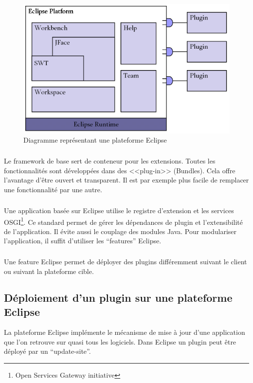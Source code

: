 \begin{figure}[!h]
\begin{center}
  \includegraphics[scale=.55]{images/archi_eclipse_platform.png}
  \caption{Diagramme représentant une plateforme Eclipse}
  \label{PlatformEclipse}
\end{center}
\end{figure}

\subparagraph*{}
Le framework de base sert de conteneur pour les extensions.
Toutes les fonctionnalités sont développées dans des <<plug-in>> (Bundles).
Cela offre l'avantage d'être ouvert et transparent. 
Il est par exemple plus facile de remplacer une fonctionnalité par une autre.

\subparagraph*{}
Une application basée sur Eclipse utilise le registre d'extension et les services OSGI\footnote{Open Services Gateway initiative}.
Ce standard permet de gérer les dépendances de plugin et l'extensibilité de l'application.
Il évite aussi le couplage des modules Java.
Pour modulariser l'application, il suffit d'utiliser les ``features'' Eclipse.

\subparagraph*{}
Une feature Eclipse permet de déployer des plugins différemment suivant le client ou suivant la plateforme cible.

\subsection{Déploiement d'un plugin sur une plateforme Eclipse}

La plateforme Eclipse implémente le mécanisme de mise à jour d'une application que l'on retrouve sur quasi tous les logiciels.
Dans Eclipse un plugin peut être déployé par un ``update-site''.

